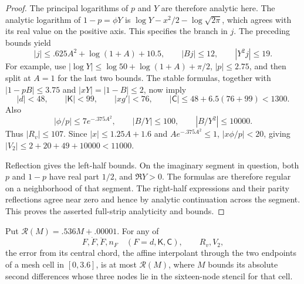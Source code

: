 \begin{proof}
The principal logarithms of \(p\) and \(Y\) are therefore analytic
here. The analytic logarithm of \(1-p=\phi Y\) is
\(\log Y-x^2/2-\log\sqrt{2\pi}\), which agrees with its real value
on the positive axis. This specifies the branch in \(j\).
The preceding bounds yield
\[
 |j|\le .625A^2+\log(1+A)+10.5,\qquad
 |Bj|\le12,\qquad |Y^2j|\le19.
\]
For example, use \(|\log Y|\le\log50+\log(1+A)+\pi/2\),
\(|p|\le2.75\), and then split at \(A=1\) for the last two bounds.
The stable formulas, together with \(|1-pB|\le3.75\) and
\(|xY|=|1-B|\le2\), now imply
\[
 |d|<48,\qquad |\mathsf K|<99,\qquad |xg'|<76,
 \qquad |\mathsf C|\le48+6.5(76+99)<1300.
\]
Also
\[
 |\phi/p|\le7e^{-.375A^2},\qquad
 |B/Y|\le100,\qquad |B/Y^2|\le10000.
\]
Thus \(|R_v|\le107\). Since
\(|x|\le1.25A+1.6\) and \(Ae^{-.375A^2}\le1\),
\(|x\phi/p|<20\), giving \(|V_2|\le2+20+49+10000<11000\).

Reflection gives the left-half bounds. On the imaginary segment in
question, both \(p\) and \(1-p\) have real part \(1/2\), and
\(\Re Y>0\). The formulas are therefore regular on a neighborhood of
that segment. The right-half expressions and their parity reflections
agree near zero and hence by analytic continuation across the segment.
This proves the asserted full-strip analyticity and bounds.
\end{proof}

\begin{lemma}
\label{lem:scalar-interpolation}
Put \(\mathcal R(M)=.536M+.00001\). For any of
\[
 F,\dot F,\ddot F,n_F\quad(F=d,\mathsf K,\mathsf C),
 \qquad R_v,V_2,
\]
the error from its central chord, the affine interpolant through the
two endpoints of a mesh cell in \([0,3.6]\), is
at most \(\mathcal R(M)\), where \(M\) bounds its absolute second
differences whose three nodes lie in the sixteen-node stencil for that cell.
\end{lemma}

